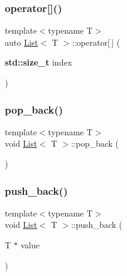 \subsubsection{\texorpdfstring{operator[]()}{operator[]()}}
{\footnotesize\ttfamily template$<$typename T$>$ \\
auto \hyperlink{struct_list}{List}$<$ T $>$\+::operator\mbox{[}$\,$\mbox{]} (\begin{DoxyParamCaption}\item[{\textbf{ std\+::size\+\_\+t}}]{index }\end{DoxyParamCaption})\hspace{0.3cm}{\ttfamily [inline]}}

\mbox{\label{struct_list_a42e1aee3e26b76b3f4d9386efa7fe8b7}} 
\subsubsection{\texorpdfstring{pop\+\_\+back()}{pop\_back()}}
{\footnotesize\ttfamily template$<$typename T$>$ \\
void \hyperlink{struct_list}{List}$<$ T $>$\+::pop\+\_\+back (\begin{DoxyParamCaption}{ }\end{DoxyParamCaption})\hspace{0.3cm}{\ttfamily [inline]}}

\mbox{\label{struct_list_af4ca3dd63fcff83845b673dfd7d5d715}} 
\subsubsection{\texorpdfstring{push\+\_\+back()}{push\_back()}}
{\footnotesize\ttfamily template$<$typename T$>$ \\
void \hyperlink{struct_list}{List}$<$ T $>$\+::push\+\_\+back (\begin{DoxyParamCaption}\item[{T $\ast$}]{value }\end{DoxyParamCaption})\hspace{0.3cm}{\ttfamily [inline]}}

\mbox{\label{struct_list_acd4b77162f54d7e3b5b3a16ffad80d40}} 
